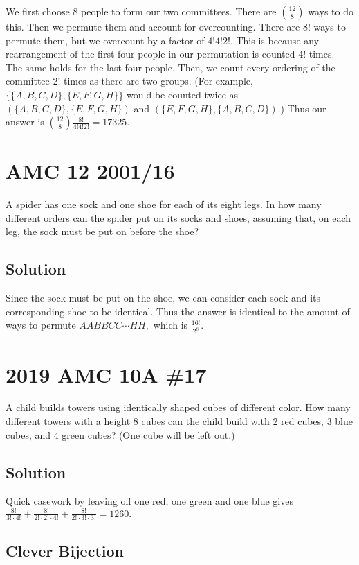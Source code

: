 \documentclass{article}
\begin{document}
We first choose $8$ people to form our two committees. There are $\binom{12}{8}$ ways to do this. Then we permute them and account for overcounting. There are $8!$ ways to permute them, but we overcount by a factor of $4!4!2!.$ This is because any rearrangement of the first four people in our permutation is counted $4!$ times. The same holds for the last four people. Then, we count every ordering of the committee $2!$ times as there are two groups. (For example, $\{\{A,B,C,D\},\{E,F,G,H\}\}$ would be counted twice as $(\{A,B,C,D\},\{E,F,G,H\})$ and $(\{E,F,G,H\},\{A,B,C,D\}).$) Thus our answer is $\binom{12}{8}\frac{8!}{4!4!2!}=17325.$

\pagebreak\section{AMC 12 2001/16}

A spider has one sock and one shoe for each of its eight legs. In how many different orders can the spider put on its socks and shoes, assuming that, on each leg, the sock must be put on before the shoe?

\subsection{Solution}

Since the sock must be put on the shoe, we can consider each sock and its corresponding shoe to be identical. Thus the answer is identical to the amount of ways to permute $AABBCC\cdots HH,$ which is $\frac{16!}{2^8}.$

\pagebreak\section{2019 AMC 10A \#17}

A child builds towers using identically shaped cubes of different color. How many different towers with a height $8$ cubes can the child build with $2$ red cubes, $3$ blue cubes, and $4$ green cubes? (One cube will be left out.)

\subsection{Solution}

Quick casework by leaving off one red, one green and one blue gives $\frac{8!}{3!\cdot4!} + \frac{8!}{2!\cdot2!\cdot4!} + \frac{8!}{2!\cdot3!\cdot3!} = 1260.$

\subsection{Clever Bijection}
\end{document}
